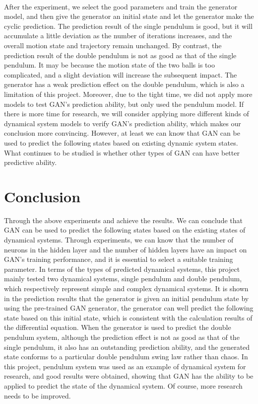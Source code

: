 \documentclass[11pt,a4paper]{article}
\begin{document}
\\
\newline
After the experiment, we select the good parameters and train the generator model, and then give the generator an initial state and let the generator make the cyclic prediction. The prediction result of the single pendulum is good, but it will accumulate a little deviation as the number of iterations increases, and the overall motion state and trajectory remain unchanged. By contrast, the prediction result of the double pendulum is not as good as that of the single pendulum. It may be because the motion state of the two balls is too complicated, and a slight deviation will increase the subsequent impact. The generator has a weak prediction effect on the double pendulum, which is also a limitation of this project. Moreover, due to the tight time, we did not apply more models to test GAN's prediction ability, but only used the pendulum model. If there is more time for research, we will consider applying more different kinds of dynamical system models to verify GAN's prediction ability, which makes our conclusion more convincing. However, at least we can know that GAN can be used to predict the following states based on existing dynamic system states. What continues to be studied is whether other types of GAN can have better predictive ability.

\newpage
\section{Conclusion}
Through the above experiments and achieve the results. We can conclude that GAN can be used to predict the following states based on the existing states of dynamical systems. Through experiments, we can know that the number of neurons in the hidden layer and the number of hidden layers have an impact on GAN's training performance, and it is essential to select a suitable training parameter. In terms of the types of predicted dynamical systems, this project mainly tested two dynamical systems, single pendulum and double pendulum, which respectively represent simple and complex dynamical systems. It is shown in the prediction results that the generator is given an initial pendulum state by using the pre-trained GAN generator, the generator can well predict the following state based on this initial state, which is consistent with the calculation results of the differential equation. When the generator is used to predict the double pendulum system, although the prediction effect is not as good as that of the single pendulum, it also has an outstanding prediction ability, and the generated state conforms to a particular double pendulum swing law rather than chaos. In this project, pendulum system was used as an example of dynamical system for research, and good results were obtained, showing that GAN has the ability to be applied to predict the state of the dynamical system. Of course, more research needs to be improved.
\end{document}

